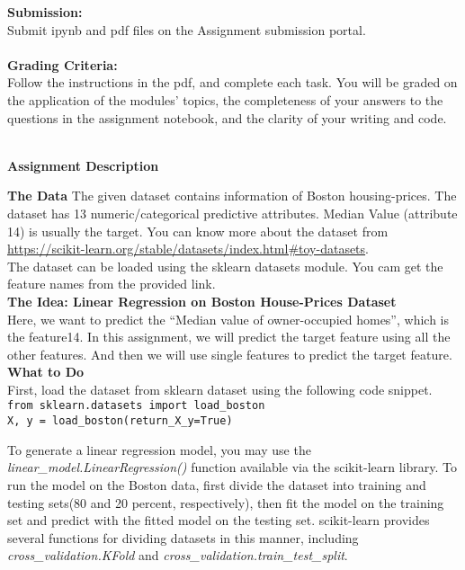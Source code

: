 \documentclass[letter-paper,12pt]{article} %
\begin{document}
\textbf{Submission:}\\

Submit ipynb and pdf files on the Assignment submission portal. \\~\\


\textbf{Grading Criteria:}\\
Follow the instructions in the pdf, and complete each task. You will be graded on the application of the modules’ topics, the completeness of your answers to the questions in the assignment notebook, and the clarity of your writing and code.\\~\\


\newpage

\begin{center}
    \Large \textbf{Assignment Description}
\end{center}

\textbf{The Data}
The given dataset contains information of Boston housing-prices. The dataset has 13 numeric/categorical predictive attributes. Median Value (attribute 14) is usually the target. You can know more about the dataset from \url{https://scikit-learn.org/stable/datasets/index.html#toy-datasets}.\\
The dataset can be loaded using the sklearn datasets module. You cam get the feature names from the provided link. \\



\textbf{The Idea: Linear Regression on Boston House-Prices Dataset}\\
Here, we want to predict the ``Median value of owner-occupied homes'', which is the feature14. In this assignment, we will predict the target feature using all the other features. And then we will use single features to predict the target feature. \\


\textbf{What to Do}\\
First, load the dataset from sklearn dataset using the following code snippet. \\

\texttt{from sklearn.datasets import load\_boston\\
X, y = load\_boston(return\_X\_y=True)\\
}


To generate a linear regression model, you may use the \textit{linear\_model.LinearRegression()} function available via the scikit-learn library. To run the model on the Boston data, first divide the dataset into training and testing sets(80 and 20 percent, respectively), then fit the model on the training set and predict with the fitted model on the testing set. scikit-learn provides several functions for dividing datasets in this manner, including \textit{cross\_validation.KFold} and \textit{cross\_validation.train\_test\_split}.
\end{document}
